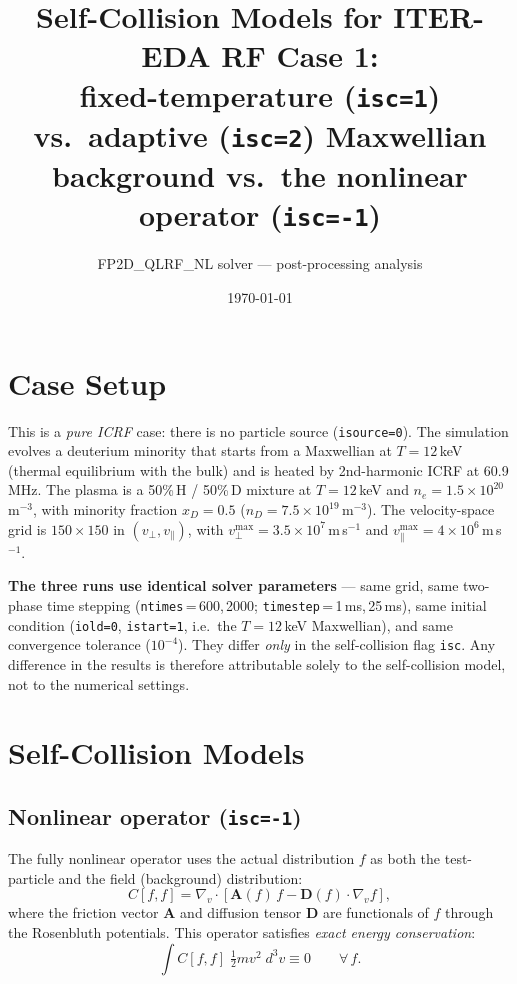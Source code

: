 \documentclass[11pt,a4paper]{article}
\title{%
  Self-Collision Models for ITER-EDA RF Case 1:\\
  fixed-temperature (\texttt{isc=1}) vs.\ adaptive (\texttt{isc=2})
  Maxwellian background vs.\ the nonlinear operator (\texttt{isc=-1})
}
\author{FP2D\_QLRF\_NL solver --- post-processing analysis}
\date{\today}
\begin{document}
\maketitle
\tableofcontents
\bigskip

\section{Case Setup}

This is a \emph{pure ICRF} case: there is no particle source
(\texttt{isource=0}). The simulation evolves a deuterium minority that starts
from a Maxwellian at $T = 12$\,keV (thermal equilibrium with the bulk) and is
heated by 2nd-harmonic ICRF at 60.9\,MHz. The plasma is a 50\%\,H / 50\%\,D
mixture at $T = 12$\,keV and $n_e = 1.5\times10^{20}$\,m$^{-3}$, with minority
fraction $x_D = 0.5$ ($n_D = 7.5\times10^{19}$\,m$^{-3}$). The velocity-space
grid is $150\times150$ in $(v_\perp, v_\parallel)$, with
$v_\perp^{\max} = 3.5\times10^{7}$\,m\,s$^{-1}$ and
$v_\parallel^{\max} = 4\times10^{6}$\,m\,s$^{-1}$.

\textbf{The three runs use identical solver parameters} --- same grid, same
two-phase time stepping (\texttt{ntimes}\,=\,600,\,2000;
\texttt{timestep}\,=\,1\,ms,\,25\,ms), same initial condition
(\texttt{iold=0}, \texttt{istart=1}, i.e.\ the $T=12$\,keV Maxwellian), and
same convergence tolerance ($10^{-4}$). They differ \emph{only} in the
self-collision flag \texttt{isc}. Any difference in the results is therefore
attributable solely to the self-collision model, not to the numerical
settings.

\section{Self-Collision Models}

\subsection{Nonlinear operator (\texttt{isc=-1})}

The fully nonlinear operator uses the actual distribution $f$ as both the
test-particle and the field (background) distribution:
\begin{equation}
  C[f,f] = \nabla_v \cdot
    \left[ \mathbf{A}(f)\,f - \mathbf{D}(f)\cdot\nabla_v f \right],
\end{equation}
where the friction vector $\mathbf{A}$ and diffusion tensor $\mathbf{D}$ are
functionals of $f$ through the Rosenbluth potentials. This operator satisfies
\emph{exact energy conservation}:
\begin{equation}
  \int C[f,f]\;\tfrac{1}{2}m v^2\; d^3v \equiv 0 \qquad \forall\, f.
\end{equation}
\end{document}
